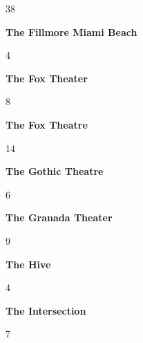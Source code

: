 \begin{center}38\end{center} 
\newline 
\begin{center}\textbf{The Fillmore Miami Beach}\end{center}
\begin{center}4\end{center} 
\newline 
\begin{center}\textbf{The Fox Theater}\end{center}
\begin{center}8\end{center} 
\newline 
\begin{center}\textbf{The Fox Theatre}\end{center}
\begin{center}14\end{center} 
\newline 
\begin{center}\textbf{The Gothic Theatre}\end{center}
\begin{center}6\end{center} 
\newline 
\begin{center}\textbf{The Granada Theater}\end{center}
\begin{center}9\end{center} 
\newline 
\begin{center}\textbf{The Hive}\end{center}
\begin{center}4\end{center} 
\newline 
\begin{center}\textbf{The Intersection}\end{center}
\begin{center}7\end{center} 
\newline 
